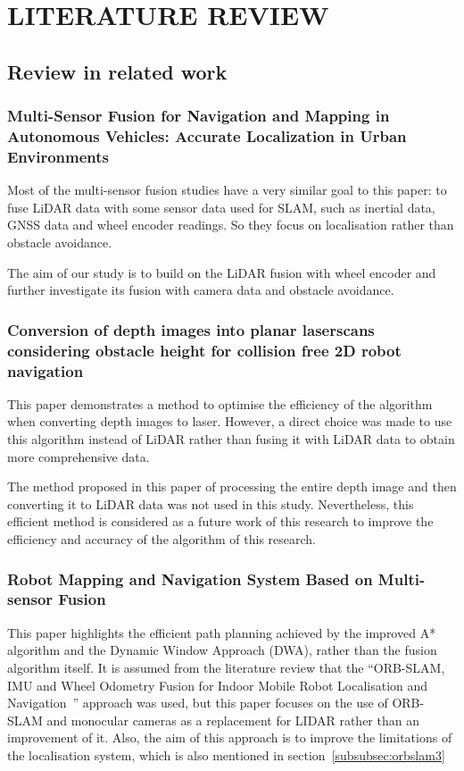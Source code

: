 \section{LITERATURE REVIEW}
\label{sec:literature_review}

\subsection{Review in related work}
\subsubsection[Multi-Sensor Fusion for Navigation and Mapping in Autonomous Vehicles: Accurate Localization in Urban Environments]{Multi-Sensor Fusion for Navigation and Mapping in Autonomous Vehicles: Accurate Localization in Urban Environments~\cite{literature1}}
Most of the multi-sensor fusion studies have a very similar goal to this paper: 
to fuse LiDAR data with some sensor data used for SLAM, such as inertial data, GNSS data and wheel encoder readings. 
So they focus on localisation rather than obstacle avoidance.

The aim of our study is to build on the LiDAR fusion with wheel encoder and further investigate its fusion with camera data and obstacle avoidance.
\subsubsection[Conversion of depth images into planar laserscans considering obstacle height for collision free 2D robot navigation]{Conversion of depth images into planar laserscans considering obstacle height for collision free 2D robot navigation~\cite{literature2}}
This paper demonstrates a method to optimise the efficiency of the algorithm when converting depth images to laser. 
However, a direct choice was made to use this algorithm instead of LiDAR rather than fusing it with LiDAR data to obtain more comprehensive data.

The method proposed in this paper of processing the entire depth image and then converting it to LiDAR data was not used in this study.
Nevertheless, this efficient method is considered as a future work of this research to improve the efficiency and accuracy of the algorithm of this research.
\subsubsection[Robot Mapping and Navigation System Based on Multi-sensor Fusion]{Robot Mapping and Navigation System Based on Multi-sensor Fusion~\cite{literature3}}
This paper highlights the efficient path planning achieved by the improved A* algorithm and the Dynamic Window Approach (DWA), rather than the fusion algorithm itself. 
It is assumed from the literature review that the ``ORB-SLAM, IMU and Wheel Odometry Fusion for Indoor Mobile Robot Localisation and Navigation~\cite{literature4}'' approach was used, 
but this paper focuses on the use of ORB-SLAM and monocular cameras as a replacement for LIDAR rather than an improvement of it. 
Also, the aim of this approach is to improve the limitations of the localisation system, which is also mentioned in section~\ref{subsubsec:orbslam3}
